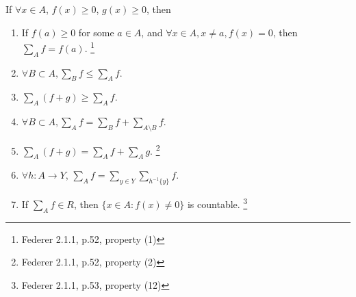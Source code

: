 \begin{lemma} \label{L:sum_pos}
If $\forall x\in A$, $f(x)\geq 0$, $g(x)\geq 0$, then 
\begin{enumerate}
  \item If $f(a)\geq 0$ for some $a\in A$, and 
    $\forall x\in A, x\neq a, f(x)=0$, then $\sum_A f= f(a)$. 
  \footnote{Federer 2.1.1, p.52, property (1)}
  \item $\forall B \subset A, \sum_B f\leq \sum_A f$.
  \item $\sum_A (f+g) \geq \sum_A f$.
  \item $\forall B \subset A, \sum_A f= \sum_B f + \sum_{A\setminus B} f$.
  \item $\sum_A (f+g) = \sum_A f + \sum_A g$.
  \footnote{Federer 2.1.1, p.52, property (2)}
  \item $\forall h:A\rightarrow Y$, 
        $\sum_A f = \sum_{y\in Y} \sum_{h^{-1}\{y\}} f$.
  \item If $\sum_A f\in R$, then $\{x\in A:f(x)\neq 0\}$ is countable.
  \footnote{Federer 2.1.1, p.53, property (12)}
\end{enumerate}
\end{lemma}

